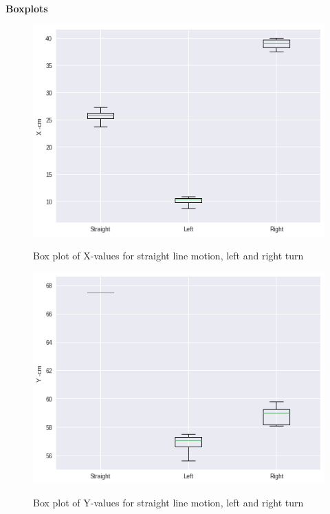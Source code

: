 \documentclass[11pt,a4paper]{article}
\begin{document}



\textbf{Boxplots}
\begin{figure}[H]
\centering
\includegraphics[width=1.0\linewidth]{boxplot-x}
\label{fig:box-x}
\caption{Box plot of X-values for straight line motion, left and right turn}
\end{figure}

\begin{figure}[H]
\centering	
\includegraphics[width=1.0\linewidth]{boxplot-y}
\label{fig:box-y}
\caption{Box plot of Y-values for straight line motion, left and right turn}
\end{figure}
\end{document}
